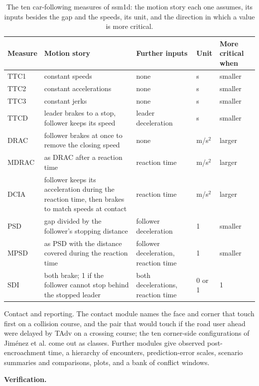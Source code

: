 \documentclass[preprint,12pt, a4paper]{elsarticle}
\begin{document}
\begin{enumerate}
\begin{enumerate}
\begin{table}[!ht]
\centering\small
\caption{The ten car-following measures of ssm1d: the motion story each one assumes, its inputs besides the gap and the speeds, its unit, and the direction in which a value is more critical.}\label{tab:ten}
\begin{tabular}{p{1.4cm}p{5.2cm}p{3.5cm}p{1.1cm}p{2.5cm}}
\hline
\textbf{Measure} & \textbf{Motion story} & \textbf{Further inputs} & \textbf{Unit} & \textbf{More critical when} \\
\hline
TTC1 & constant speeds & none & s & smaller \\
TTC2 & constant accelerations & none & s & smaller \\
TTC3 & constant jerks & none & s & smaller \\
TTCD & leader brakes to a stop, follower keeps its speed & leader deceleration & s & smaller \\
DRAC & follower brakes at once to remove the closing speed & none & m/s$^2$ & larger \\
MDRAC & as DRAC after a reaction time & reaction time & m/s$^2$ & larger \\
DCIA & follower keeps its acceleration during the reaction time, then brakes to match speeds at contact & reaction time & m/s$^2$ & larger \\
PSD & gap divided by the follower's stopping distance & follower deceleration & 1 & smaller \\
MPSD & as PSD with the distance covered during the reaction time & follower deceleration, reaction time & 1 & smaller \\
SDI & both brake; 1 if the follower cannot stop behind the stopped leader & both decelerations, reaction time & 0 or 1 & 1 \\
\hline
\end{tabular}
\end{table}

Contact and reporting. The contact module names the face and corner that touch first on a collision course, and the pair that would touch if the road user ahead were delayed by TAdv on a crossing course; the ten corner-side configurations of Jiménez et al. \cite{jimenez2013} come out as classes. Further modules give observed post-encroachment time, a hierarchy of encounters, prediction-error scales, scenario summaries and comparisons, plots, and a bank of conflict windows.

\textbf{Verification.}


\end{enumerate}
\end{enumerate}
\end{document}
